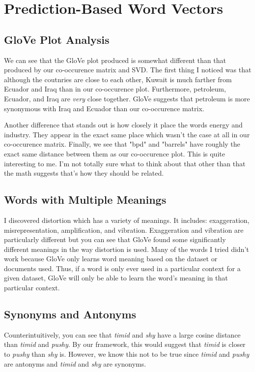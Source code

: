 \documentclass[12pt]{article}
\begin{document}
\section{Prediction-Based Word Vectors}

\subsection{GloVe Plot Analysis}
We can see that the GloVe plot produced is somewhat different than that produced by our co-occurence
matrix and SVD. The first thing I noticed was that although the coutnries are close to each other, 
Kuwait is much farther from Ecuador and Iraq than in our co-occurence plot. Furthermore, petroleum, 
Ecuador, and Iraq are \emph{very} close together. GloVe suggests that petroleum is more synonymous 
with Iraq and Ecuador than our co-occurence matrix. 

Another difference that stands out is how closely it place the words energy and industry. They appear 
in the exact same place which wasn't the case at all in our co-occurence matrix. Finally, we see that 
"bpd" and "barrels" have roughly the exact same distance between them as our co-occurence plot. This
is quite interesting to me. I'm not totally sure what to think about that other than that the math 
suggests that's how they should be related. 

\subsection{Words with Multiple Meanings}
I discovered distortion which has a variety of meanings. It includes: exaggeration, misrepresentation, 
amplification, and vibration. Exaggeration and vibration are particularly different but you can see 
that GloVe found some significantly different meanings in the way distortion is used. Many of the words
I tried didn't work because GloVe only learns word meaning based on the dataset or documents used. 
Thus, if a word is only ever used in a particular context for a given dataset, GloVe will only be 
able to learn the word's meaning in that particular context.

\subsection{Synonyms and Antonyms}
Counterintuitively, you can see that \emph{timid} and \emph{shy} have a large cosine distance than 
\emph{timid} and \emph{pushy}. By our framework, this would suggest that \emph{timid} is closer to 
\emph{pushy} than \emph{shy} is. However, we know this not to be true since \emph{timid} and \emph{pushy}
are antonyms and \emph{timid} and \emph{shy} are synonyms. 
\end{document}
